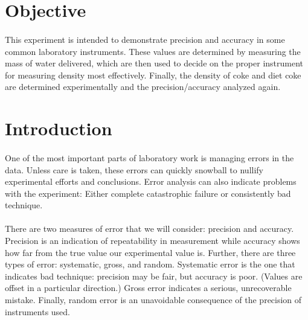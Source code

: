 \documentclass[fleqn,titlepage]{article}
\begin{document}
\section{Objective}
  \paragraph{} This experiment is intended to demonstrate precision and accuracy in some common laboratory instruments. These values are determined by measuring the mass of water delivered, which are then used to decide on the proper instrument for measuring density most effectively. Finally, the density of coke and diet coke are determined experimentally and the precision/accuracy analyzed again.

\newpage
\section{Introduction}
  \paragraph{} One of the most important parts of laboratory work is managing errors in the data. Unless care is taken, these errors can quickly snowball to nullify experimental efforts and conclusions. Error analysis can also indicate problems with the experiment: Either complete catastrophic failure or consistently bad technique.
  \paragraph{} There are two measures of error that we will consider: precision and accuracy. Precision is an indication of repeatability in measurement while accuracy shows how far from the true value our experimental value is. Further, there are three types of error: systematic, gross, and random. Systematic error is the one that indicates bad technique: precision may be fair, but accuracy is poor. (Values are offset in a particular direction.)
  Gross error indicates a serious, unrecoverable mistake. Finally, random error is an unavoidable consequence of the precision of instruments used.
\end{document}
